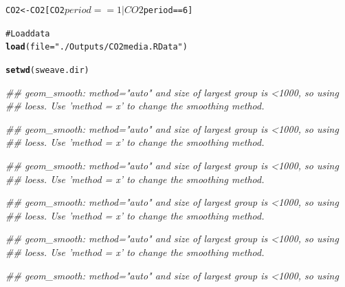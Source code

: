 \documentclass{article}\usepackage{graphicx, color}
\makeatletter
\newcommand{\hlfunctioncall}[1]{\textcolor[rgb]{0.501960784313725,0,0.329411764705882}{\textbf{#1}}}%
\newcommand{\hlstring}[1]{\textcolor[rgb]{0.6,0.6,1}{#1}}%
\newcommand{\hlcomment}[1]{\textcolor[rgb]{0.180392156862745,0.6,0.341176470588235}{#1}}%
\newenvironment{kframe}{%
 \def\at@end@of@kframe{}%
 \ifinner\ifhmode%
  \def\at@end@of@kframe{\end{minipage}}%
  \begin{minipage}{\columnwidth}%
 \fi\fi%
 \def\FrameCommand##1{\hskip\@totalleftmargin \hskip-\fboxsep
 \colorbox{shadecolor}{##1}\hskip-\fboxsep
     \hskip-\linewidth \hskip-\@totalleftmargin \hskip\columnwidth}%
 \MakeFramed {\advance\hsize-\width
   \@totalleftmargin\z@ \linewidth\hsize
   \@setminipage}}%
 {\par\unskip\endMakeFramed%
 \at@end@of@kframe}
\newenvironment{knitrout}{}{} %
\makeatother
\begin{document}
\begin{knitrout}
\begin{kframe}
\begin{alltt}
CO2 <- CO2[CO2$period == 1 | CO2$period == 6]

\hlcomment{# Load data}
\hlfunctioncall{load}(file = \hlstring{"./Outputs/CO2media.RData"})

\hlfunctioncall{setwd}(sweave.dir)
\end{alltt}
\end{kframe}
\end{knitrout}


\begin{knitrout}
\color{fgcolor}\begin{kframe}
\begin{flushleft}\ttfamily\noindent\itshape\textcolor{messagecolor}{\#\# geom\_smooth: method="auto" and size of largest group is <1000, so using \\ 
\#\# loess. Use 'method = x' to change the smoothing method.}\end{flushleft}\begin{flushleft}\ttfamily\noindent\itshape\textcolor{messagecolor}{\#\# geom\_smooth: method="auto" and size of largest group is <1000, so using \\ 
\#\# loess. Use 'method = x' to change the smoothing method.}\end{flushleft}\begin{flushleft}\ttfamily\noindent\itshape\textcolor{messagecolor}{\#\# geom\_smooth: method="auto" and size of largest group is <1000, so using \\ 
\#\# loess. Use 'method = x' to change the smoothing method.}\end{flushleft}\begin{flushleft}\ttfamily\noindent\itshape\textcolor{messagecolor}{\#\# geom\_smooth: method="auto" and size of largest group is <1000, so using \\ 
\#\# loess. Use 'method = x' to change the smoothing method.}\end{flushleft}\begin{flushleft}\ttfamily\noindent\itshape\textcolor{messagecolor}{\#\# geom\_smooth: method="auto" and size of largest group is <1000, so using \\ 
\#\# loess. Use 'method = x' to change the smoothing method.}\end{flushleft}\begin{flushleft}\ttfamily\noindent\itshape\textcolor{messagecolor}{\#\# geom\_smooth: method="auto" and size of largest group is <1000, so using \\ 
}
\end{flushleft}
\end{kframe}
\end{knitrout}
\end{document}
